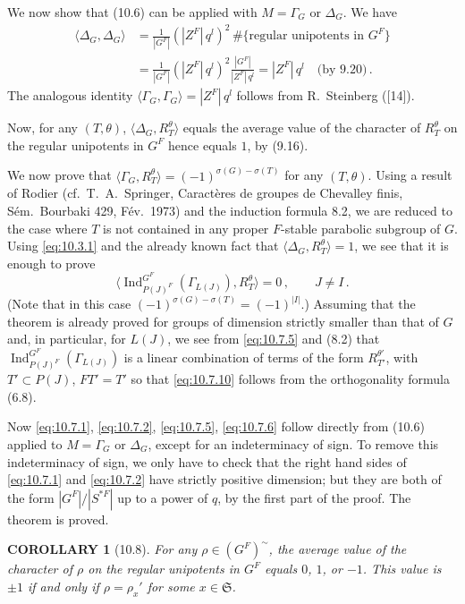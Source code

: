 \documentclass{amsart}
\theoremstyle{plain}
\newtheorem{corollary}[theorem]{COROLLARY}
\theoremstyle{remark}
\DeclareMathOperator{\Ind}{Ind}
\begin{document}
We now show that (10.6) can be applied with $M = \Gamma_G$ or $\Delta_G$. We have
\begin{align*}
\langle \Delta_G, \Delta_G \rangle &= \frac{1}{|G^F|} (|Z^F|\, q^l)^2 \, \#\{\text{regular unipotents in } G^F\} \\
&= \frac{1}{|G^F|} (|Z^F|\, q^l)^2 \frac{|G^F|}{|Z^F|\, q^l} = |Z^F|\, q^l \quad \text{(by 9.20)}\,.
\end{align*}
The analogous identity $\langle \Gamma_G, \Gamma_G \rangle = |Z^F|\, q^l$ follows from R.~Steinberg ([14]).

Now, for any $(T, \theta)$, $\langle \Delta_G, R_T^\theta \rangle$ equals the average value of the character of $R_T^\theta$ on the regular unipotents in $G^F$ hence equals $1$, by (9.16).

We now prove that $\langle \Gamma_G, R_T^\theta \rangle = (-1)^{\sigma(G) - \sigma(T)}$ for any $(T, \theta)$. Using a result of Rodier (cf.\ T.~A.~Springer, Caract\`eres de groupes de Chevalley finis, S\'em.\ Bourbaki 429, F\'ev.\ 1973) and the induction formula 8.2, we are reduced to the case where $T$ is not contained in any proper $F$-stable parabolic subgroup of $G$. Using \eqref{eq:10.3.1} and the already known fact that $\langle \Delta_G, R_T^\theta \rangle = 1$, we see that it is enough to prove
\begin{equation}\label{eq:10.7.10}
\langle \Ind_{P(J)^F}^{G^F}(\Gamma_{L(J)}), R_T^\theta \rangle = 0\,, \qquad J \neq I\,.
\end{equation}
(Note that in this case $(-1)^{\sigma(G) - \sigma(T)} = (-1)^{|I|}$.) Assuming that the theorem is already proved for groups of dimension strictly smaller than that of $G$ and, in particular, for $L(J)$, we see from \eqref{eq:10.7.5} and (8.2) that $\Ind_{P(J)^F}^{G^F}(\Gamma_{L(J)})$ is a linear combination of terms of the form $R_{T'}^{\theta'}$, with $T' \subset P(J)$, $FT' = T'$ so that \eqref{eq:10.7.10} follows from the orthogonality formula (6.8).

Now \eqref{eq:10.7.1}, \eqref{eq:10.7.2}, \eqref{eq:10.7.5}, \eqref{eq:10.7.6} follow directly from (10.6) applied to $M = \Gamma_G$ or $\Delta_G$, except for an indeterminacy of sign. To remove this indeterminacy of sign, we only have to check that the right hand sides of \eqref{eq:10.7.1} and \eqref{eq:10.7.2} have strictly positive dimension; but they are both of the form $|G^F|/|S^{*F}|$ up to a power of $q$, by the first part of the proof. The theorem is proved.

\begin{corollary}[10.8]
For any $\rho \in (G^F)^{\sim}$, the average value of the character of $\rho$ on the regular unipotents in $G^F$ equals $0$, $1$, or $-1$. This value is $\pm 1$ if and only if $\rho = \rho_x'$ for some $x \in \mathfrak{S}$.
\end{corollary}
\end{document}
